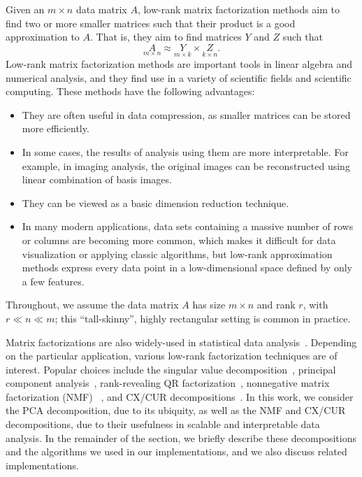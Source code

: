 
Given an $m \times n$ data matrix $A$, low-rank matrix factorization methods aim to find two or more smaller matrices such that their product is a good approximation to $A$.
That is, they aim to find matrices $Y$ and $Z$ such that
\begin{equation*}
 \label{eqn:apprx}
    \underset{m\times n}{A} \approx \underset{m\times k}{Y} \times \underset{k\times n}{Z}. 
\end{equation*}
Low-rank matrix factorization methods are important tools in linear algebra and numerical analysis, and they find use in a variety of scientific fields and scientific computing. These methods have the following advantages:
\begin{itemize}
  \item They are often useful in data compression, as smaller matrices can be stored more efficiently.
  \item In some cases, the results of analysis using them are more interpretable. For example, in imaging analysis, the original images can be reconstructed using linear combination of basis images.
  \item They can be viewed as a basic dimension reduction technique.
  \item In many modern applications, data sets containing a massive number of rows or columns are becoming more common, which makes it difficult for data visualization or applying classic algorithms, but low-rank approximation methods express every data point in a low-dimensional space defined by only a few features.
\end{itemize}
Throughout, we assume the data matrix $A$ has size $m \times n$ and rank $r$, with $r \ll n \ll m$; this ``tall-skinny'', highly rectangular setting is common in practice. 

Matrix factorizations are also widely-used in statistical data analysis~\cite{HMH00}.
Depending on the particular application, various low-rank factorization techniques are of interest. Popular choices include the singular value decomposition~\cite{GVL96}, principal component analysis~\cite{pcaBook}, rank-revealing QR factorization~\cite{GE96}, nonnegative matrix factorization (NMF) ~\cite{NMFalg}, and CX/CUR decompositions~\cite{CUR_PNAS}. In this work, we consider the PCA decomposition, due to its ubiquity, as well as the NMF and CX/CUR decompositions, due to their usefulness in scalable and interpretable data analysis. In the remainder of the section, we briefly describe these decompositions and the algorithms we used in our implementations, and we also discuss related implementations. 

